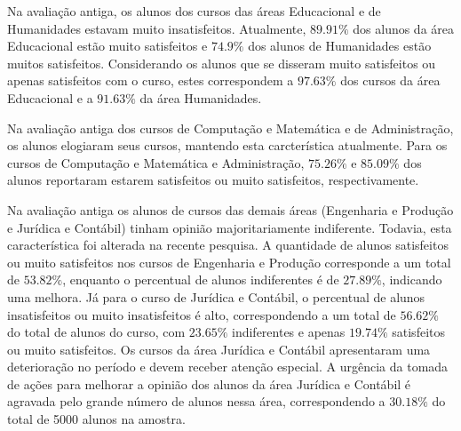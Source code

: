 \documentclass[10pt,a4paper,oneside]{article}
\newcommand{\adm}{Administração\xspace}
\newcommand{\comp}{Computação e Matemática\xspace}
\newcommand{\edu}{Educacional\xspace}
\newcommand{\eng}{Engenharia e Produção\xspace}
\newcommand{\hum}{Humanidades\xspace}
\newcommand{\jur}{Jurídica e Contábil\xspace}
\begin{document}
Na avaliação antiga, os alunos dos cursos das áreas \edu e de \hum estavam muito insatisfeitos. Atualmente, $89.91\%$ dos alunos da área \edu estão muito satisfeitos e $74.9\%$ dos alunos de \hum estão muitos satisfeitos. Considerando os alunos que se disseram muito satisfeitos ou apenas satisfeitos com o curso, estes correspondem a $97.63\%$ dos cursos da área \edu e a $91.63\%$ da área \hum.

Na avaliação antiga dos cursos de \comp e de \adm, os alunos elogiaram seus cursos, mantendo esta carcterística atualmente. Para os cursos de \comp e \adm, $75.26\%$ e $85.09\%$ dos alunos reportaram estarem satisfeitos ou muito satisfeitos, respectivamente.

Na avaliação antiga os alunos de cursos das demais áreas (\eng e \jur) tinham opinião majoritariamente indiferente. Todavia, esta característica foi alterada na recente pesquisa. A quantidade de alunos satisfeitos ou muito satisfeitos nos cursos de \eng corresponde a um total de $53.82\%$, enquanto o percentual de alunos indiferentes é de $27.89\%$, indicando uma melhora. Já para o curso de Jurídica e Contábil, o percentual de alunos insatisfeitos ou muito insatisfeitos é alto, correspondendo a um total de $56.62\%$ do total de alunos do curso, com $23.65\%$ indiferentes e apenas $19.74\%$ satisfeitos ou muito satisfeitos. Os cursos da área  \jur apresentaram uma deterioração no período e devem receber atenção especial. A urgência da tomada de ações para melhorar a opinião dos alunos da área \jur é agravada pelo grande número de alunos nessa área, correspondendo a  $30.18\%$ do total de 5000 alunos na amostra.
\end{document}
